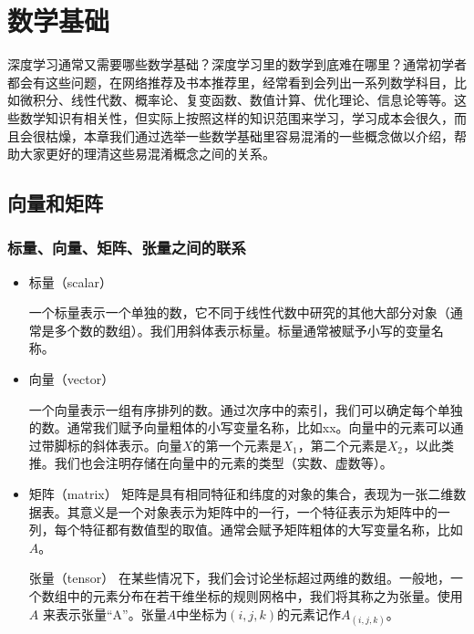 


\chapter{数学基础}

深度学习通常又需要哪些数学基础？深度学习里的数学到底难在哪里？通常初学者都会有这些问题，在网络推荐及书本推荐里，经常看到会列出一系列数学科目，比如微积分、线性代数、概率论、复变函数、数值计算、优化理论、信息论等等。这些数学知识有相关性，但实际上按照这样的知识范围来学习，学习成本会很久，而且会很枯燥，本章我们通过选举一些数学基础里容易混淆的一些概念做以介绍，帮助大家更好的理清这些易混淆概念之间的关系。

\section{向量和矩阵}

\subsection{标量、向量、矩阵、张量之间的联系}

\begin{itemize}\itemsep0em
		\item 标量（scalar）

			一个标量表示一个单独的数，它不同于线性代数中研究的其他大部分对象（通常是多个数的数组）。我们用斜体表示标量。标量通常被赋予小写的变量名称。 

		\item 向量（vector）

			一个向量表示一组有序排列的数。通过次序中的索引，我们可以确定每个单独的数。通常我们赋予向量粗体的小写变量名称，比如xx。向量中的元素可以通过带脚标的斜体表示。向量$X$的第一个元素是$X_1$，第二个元素是$X_2$，以此类推。我们也会注明存储在向量中的元素的类型（实数、虚数等）。

		\item 矩阵（matrix）
			矩阵是具有相同特征和纬度的对象的集合，表现为一张二维数据表。其意义是一个对象表示为矩阵中的一行，一个特征表示为矩阵中的一列，每个特征都有数值型的取值。通常会赋予矩阵粗体的大写变量名称，比如$A$。

		张量（tensor）
		在某些情况下，我们会讨论坐标超过两维的数组。一般地，一个数组中的元素分布在若干维坐标的规则网格中，我们将其称之为张量。使用 $A$ 来表示张量“A”。张量$A$中坐标为$(i,j,k)$的元素记作$A_{(i,j,k)}$。

\end{itemize}


